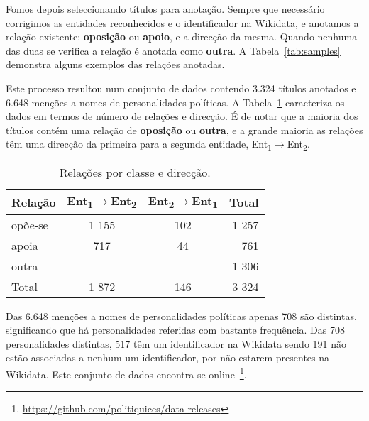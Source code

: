 \documentclass[a4paper, twocolumn, 11pt, twoside]{article}
\begin{document}
Fomos depois seleccionando títulos para anotação. Sempre que necessário corrigimos as entidades reconhecidos e o identificador na Wikidata, e anotamos a relação existente: \textbf{oposição} ou \textbf{apoio}, e a direcção da mesma. Quando nenhuma das duas se verifica a relação é anotada como \textbf{outra}. A Tabela~\ref{tab:samples} demonstra alguns exemplos das relações anotadas.

Este processo resultou num conjunto de dados contendo 3.324 títulos anotados e 6.648 menções a nomes de personalidades políticas. A Tabela~\ref{tab:rel_dataset} caracteriza os dados em termos de número de relações e direcção. É de notar que a maioria dos títulos contém uma relação de \textbf{oposição} ou \textbf{outra}, e a grande maioria as relações têm uma direcção da primeira para a segunda entidade, Ent\textsubscript{1}$\rightarrow$Ent\textsubscript{2}.


\begin{table}
    \begin{center}
    \begin{tabular}{l ccr}
        {\bf Relação} & {\bf \footnotesize{Ent\textsubscript{1}$\rightarrow$Ent\textsubscript{2}}} & {\bf \footnotesize{Ent\textsubscript{2}$\rightarrow$Ent\textsubscript{1}}} & {\bf Total} \\
        \hline
        opõe-se          &  1 155  &  102  &  1 257  \\
        apoia            &    717  &   44  &    761  \\
        outra            &    -    &   -   &  1 306  \\
		\hline
		Total			 &  1 872  &  146  &  3 324  \\
    \end{tabular}
	\caption{Relações por classe e direcção.}
	\label{tab:rel_dataset}
	\end{center}
\end{table}


Das 6.648 menções a nomes de personalidades políticas apenas 708 são distintas, significando que há personalidades referidas com bastante frequência. Das 708 personalidades distintas, 517 têm um identificador na Wikidata sendo 191 não estão associadas a nenhum um identificador, por não estarem presentes na Wikidata. Este conjunto de dados encontra-se online~\footnote{\url{https://github.com/politiquices/data-releases}}.
\end{document}
